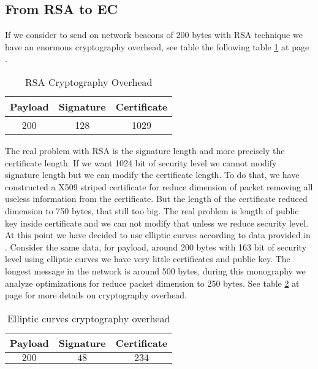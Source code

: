 \subsection{From RSA to EC}
If we consider to send on network beacons of 200 bytes with RSA technique we have an enormous cryptography overhead, see table the following table \ref{tab:RSAOverHead} at page \pageref{tab:RSAOverHead}.
\begin{table}[!ht]
	\centering
	\caption{RSA Cryptography Overhead}
	\begin{tabular}{|c|c|c|}
	\hline\hline 
	\textbf{Payload} & \textbf{Signature} & \textbf{Certificate}\\
	\hline
	200 & 128 & 1029 \\
	\hline
	\hline     %
 	\end{tabular} 
	\label{tab:RSAOverHead}
\end{table}
The real problem with RSA is the signature length and more precisely the  certificate length. If we want 1024 bit of security level we cannot modify signature length but we can modify the  certificate length. To do that, we have constructed a X509 striped certificate for reduce dimension of packet removing all useless information from the  certificate. But the length of the certificate reduced dimension to 750 bytes, that still too big. The real problem is length of public key inside certificate and we can not modify that unless we reduce security level.\\
At this point we have decided to use elliptic curves according to data provided in \cite{calandriello}. Consider the same data, for payload, around 200 bytes with 163 bit of security level using elliptic curves we have very little certificates and public key. The longest message in the network is around 500 bytes, during this monography we analyze optimizations for reduce packet dimension to 250 bytes. See table \ref{tab:CryptographyOverhead} at page \pageref{tab:CryptographyOverhead} for more details on cryptography overhead.
\begin{table}[!ht]
	\centering
	\caption{Elliptic curves cryptography overhead}
	\begin{tabular}{|c|c|c|}
	\hline\hline 
	\textbf{Payload} & \textbf{Signature} & \textbf{Certificate}\\
	\hline
	$200$ &	$48$ & $234$\\
	\hline
	\hline     %
 	\end{tabular}
	\label{tab:CryptographyOverhead}
\end{table}
